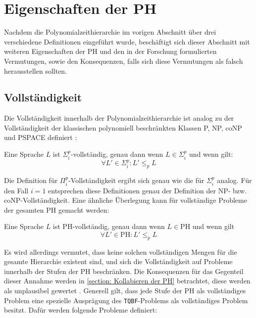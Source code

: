 \chapter{Eigenschaften der PH} \label{chapter: Eigenschaften der PH}
Nachdem die Polynomialzeithierarchie im vorigen Abschnitt über drei verschiedene Definitionen eingeführt wurde, beschäftigt sich dieser Abschnitt mit 
weiteren Eigenschaften der PH und den in der Forschung formulierten Vermutungen, sowie den Konsequenzen, falls sich diese Vermutungen als falsch herausstellen sollten.

\section{Vollständigkeit} \label{section: Vollständige Mengen innerhalb der PH}
Die Vollständigkeit innerhalb der Polynomialzeithierarchie ist analog zu der Vollständigkeit der klassischen polynomiell beschränkten Klassen
P, NP, coNP und PSPACE definiert \cite{arora_computational_2009}:

\begin{definition} \cite{arora_computational_2009}
    Eine Sprache $L$ ist $\Sigma^p_i$-vollständig, genau dann wenn $L \in \Sigma^p_i$ und wenn gilt: 
    $$
    \forall L' \in \Sigma^p_i : L' \leq_p L
    $$
\end{definition}

Die Definition für $\Pi^p_i$-Vollständigkeit ergibt sich genau wie die für $\Sigma^p_i$ analog.
Für den Fall $i = 1$ entsprechen diese Definitionen genau der Definition der NP- bzw. coNP-Vollständigkeit.
Eine ähnliche Überlegung kann für vollständige Probleme der gesamten PH gemacht werden:

\begin{definition}[PH-Vollständigkeit] \cite{arora_computational_2009}
    Eine Sprache $L$ ist PH-vollständig, genau dann wenn $L \in \text{PH}$ und wenn gilt 
    $$
    \forall L' \in \text{PH} : L' \leq_p L
    $$
\end{definition}

Es wird allerdings vermutet, dass keine solchen vollständigen Mengen für die gesamte Hierarchie existent sind, und sich die Vollständigkeit auf Probleme innerhalb der
Stufen der PH beschränken. Die Konsequenzen für das Gegenteil dieser Annahme werden in \ref{section: Kollabieren der PH} betrachtet, diese werden als unplausibel gewertet \cite{arora_computational_2009}.
Generell gilt, dass jede Stufe der PH als vollständiges Problem eine spezielle Ausprägung des \texttt{TQBF}-Problems als vollständiges Problem besitzt.
Dafür werden folgende Probleme definiert:

